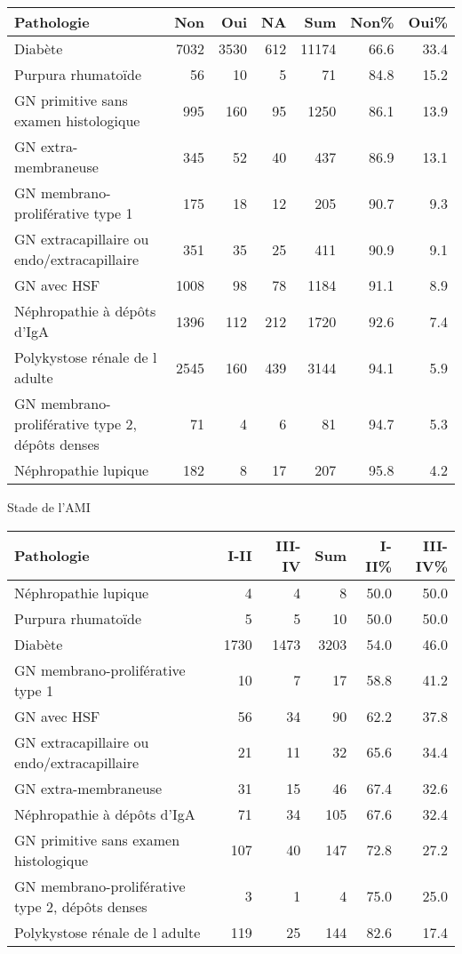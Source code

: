\documentclass[11pt,a4paper]{article}\usepackage[]{graphicx}\usepackage[]{color}
\begin{document}
\begin{table}[H]
\centering
\begin{tabular}{lrrrrrr}
  \hline
Pathologie & Non & Oui & NA & Sum & Non\% & Oui\% \\ 
  \hline
Diabète & 7032 & 3530 & 612 & 11174 & 66.6 & 33.4 \\ 
  Purpura rhumatoïde & 56 & 10 &  5 & 71 & 84.8 & 15.2 \\ 
  GN primitive sans examen histologique & 995 & 160 & 95 & 1250 & 86.1 & 13.9 \\ 
  GN extra-membraneuse & 345 & 52 & 40 & 437 & 86.9 & 13.1 \\ 
  GN membrano-proliférative type 1 & 175 & 18 & 12 & 205 & 90.7 & 9.3 \\ 
  GN extracapillaire ou endo/extracapillaire & 351 & 35 & 25 & 411 & 90.9 & 9.1 \\ 
  GN avec HSF & 1008 & 98 & 78 & 1184 & 91.1 & 8.9 \\ 
  Néphropathie à dépôts d'IgA & 1396 & 112 & 212 & 1720 & 92.6 & 7.4 \\ 
  Polykystose rénale de l adulte & 2545 & 160 & 439 & 3144 & 94.1 & 5.9 \\ 
  GN membrano-proliférative type 2, dépôts denses & 71 &  4 &  6 & 81 & 94.7 & 5.3 \\ 
  Néphropathie lupique & 182 &  8 & 17 & 207 & 95.8 & 4.2 \\ 
   \hline
\end{tabular}
\end{table}


Stade de l’AMI

\begin{table}[H]
\centering
\begin{tabular}{lrrrrr}
  \hline
Pathologie & I-II & III-IV & Sum & I-II\% & III-IV\% \\ 
  \hline
Néphropathie lupique &  4 &  4 &  8 & 50.0 & 50.0 \\ 
  Purpura rhumatoïde &  5 &  5 & 10 & 50.0 & 50.0 \\ 
  Diabète & 1730 & 1473 & 3203 & 54.0 & 46.0 \\ 
  GN membrano-proliférative type 1 & 10 &  7 & 17 & 58.8 & 41.2 \\ 
  GN avec HSF & 56 & 34 & 90 & 62.2 & 37.8 \\ 
  GN extracapillaire ou endo/extracapillaire & 21 & 11 & 32 & 65.6 & 34.4 \\ 
  GN extra-membraneuse & 31 & 15 & 46 & 67.4 & 32.6 \\ 
  Néphropathie à dépôts d'IgA & 71 & 34 & 105 & 67.6 & 32.4 \\ 
  GN primitive sans examen histologique & 107 & 40 & 147 & 72.8 & 27.2 \\ 
  GN membrano-proliférative type 2, dépôts denses &  3 &  1 &  4 & 75.0 & 25.0 \\ 
  Polykystose rénale de l adulte & 119 & 25 & 144 & 82.6 & 17.4 \\ 
   \hline
\end{tabular}
\end{table}
\end{document}
